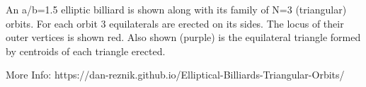 An a/b=1.5 elliptic billiard is shown along with its family of N=3 (triangular) orbits. For each orbit 3 equilaterals are erected on its sides. The locus of their outer vertices is shown red. Also shown (purple) is the equilateral triangle formed by centroids of each triangle erected.

More Info:  https://dan-reznik.github.io/Elliptical-Billiards-Triangular-Orbits/
